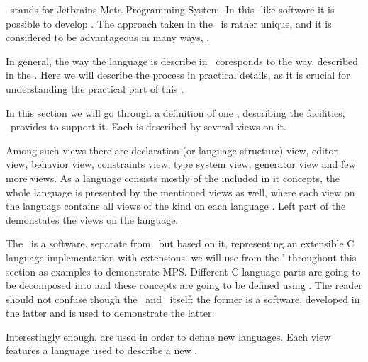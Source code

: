 
\jbmps\ stands for Jetbrains Meta Programming System. In this -like software it is possible to develop .
The approach taken in the \jbmps\ is rather unique, and it is considered to be advantageous in many ways, \cite{Voelter:MoDELS:2010}.


In general, the way the language is describe in \jbmps\ coresponds to the way, described in the .
Here we will describe the process in practical details, as it is crucial for understanding the practical part of this \MT.

In this section we will go through a definition of one , describing the facilities, \jbmps\ provides to support
it. Each  is described by several views on it. 


Among such views there are  declaration (or language structure) view, editor view, behavior view, constraints view, type system view,
generator view and few more views. As a language consists mostly of the included in it concepts, 
the whole language is presented by the mentioned views as well, where each view on the language contains all views of the kind on each language . 
Left part of the  demonstates the views on the  language.


The \mbp\ is a software, separate from \jbmps\, but based on it, representing an extensible C language implementation with extensions.
we will use  from the \mbp' throughout this section as examples to demonstrate MPS. Different C language parts are going to be 
decomposed into  and these concepts are going to be defined using \jbmps. The reader should not confuse though the \mbp\ and 
\jbmps\ itself: the former is a software, developed in the latter and is used to demonstrate the latter.

Interestingly enough,  are used in order to define new languages. Each view features a language used to describe a new .

